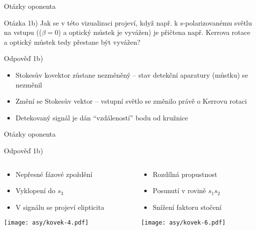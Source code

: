 \begin{frame}{Otázky oponenta}
    \begin{block}{Otázka 1b)}
        Jak se v této vizualizaci projeví, když např. k s-polarizovanému světlu na vstupu (($\beta=0$) a optický můstek je vyvážen) je přičtena např. Kerrova rotace a optický můstek tedy přestane být vyvážen?
    \end{block}
    \begin{exampleblock}{Odpověď 1b)}
        \begin{itemize}
            \item Stokesův kovektor zůstane nezměněný -- stav detekční aparatury (můstku) se nezměnil
            \item Změní se Stokesův vektor -- vstupní světlo se změnilo právě o Kerrovu rotaci
            \item Detekovaný signál je dán ``vzdáleností'' bodu od kružnice
        \end{itemize}
    \end{exampleblock}
\end{frame}

\begin{frame}{Otázky oponenta}
    \begin{exampleblock}{Odpověď 1b)}
        \begin{columns}
            \begin{column}{0.5\textwidth}
                \begin{itemize}
                    \item Nepřesné fázové zpoždění
                    \item Vyklopení do $s_3$ 
                    \item V signálu se projeví elipticita
                \end{itemize} 
                \texttt{[image: asy/kovek-4.pdf]}
            \end{column}
            \begin{column}{0.5\textwidth}
                \begin{itemize}
                    \item Rozdílná propustnost
                    \item Posunutí v rovině $s_1s_2$
                    \item Snížení faktoru stočení
                \end{itemize} 
                \texttt{[image: asy/kovek-6.pdf]}
            \end{column}
        \end{columns}
    \end{exampleblock}
\end{frame}

